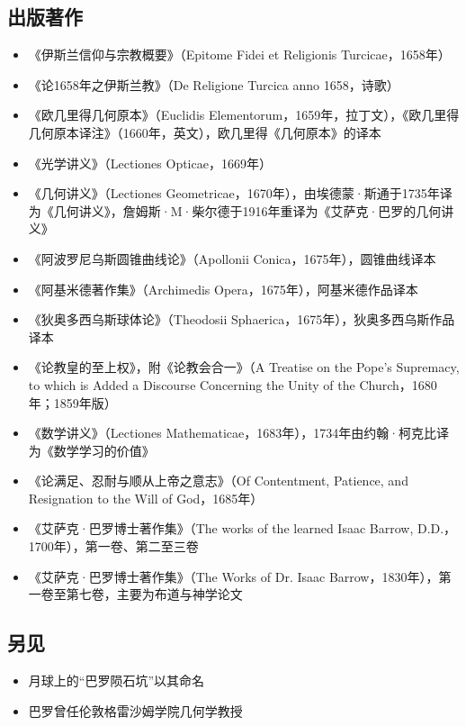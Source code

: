 \subsection{出版著作}
\begin{itemize}
\item 《伊斯兰信仰与宗教概要》（Epitome Fidei et Religionis Turcicae，1658年）
\item 《论1658年之伊斯兰教》（De Religione Turcica anno 1658，诗歌）
\item 《欧几里得几何原本》（Euclidis Elementorum，1659年，拉丁文），《欧几里得几何原本译注》（1660年，英文），欧几里得《几何原本》的译本
\item 《光学讲义》（Lectiones Opticae，1669年）
\item 《几何讲义》（Lectiones Geometricae，1670年），由埃德蒙·斯通于1735年译为《几何讲义》，詹姆斯·M·柴尔德于1916年重译为《艾萨克·巴罗的几何讲义》
\item 《阿波罗尼乌斯圆锥曲线论》（Apollonii Conica，1675年），圆锥曲线译本
\item 《阿基米德著作集》（Archimedis Opera，1675年），阿基米德作品译本
\item 《狄奥多西乌斯球体论》（Theodosii Sphaerica，1675年），狄奥多西乌斯作品译本
\item 《论教皇的至上权》，附《论教会合一》（A Treatise on the Pope's Supremacy, to which is Added a Discourse Concerning the Unity of the Church，1680年；1859年版）
\item 《数学讲义》（Lectiones Mathematicae，1683年），1734年由约翰·柯克比译为《数学学习的价值》
\item 《论满足、忍耐与顺从上帝之意志》（Of Contentment, Patience, and Resignation to the Will of God，1685年）
\item 《艾萨克·巴罗博士著作集》（The works of the learned Isaac Barrow, D.D.，1700年），第一卷、第二至三卷
\item 《艾萨克·巴罗博士著作集》（The Works of Dr. Isaac Barrow，1830年），第一卷至第七卷，主要为布道与神学论文
\end{itemize}

\subsection{另见}
\begin{itemize}
\item 月球上的“巴罗陨石坑”以其命名
\item 巴罗曾任伦敦格雷沙姆学院几何学教授
\end{itemize}
